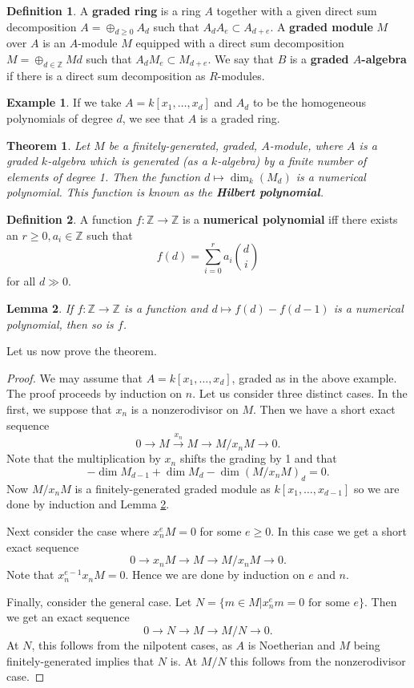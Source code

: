 \documentclass{article}
\newcommand{\Z}{\mathbb{Z}}
\theoremstyle{plain}
\newtheorem{thm}{Theorem}
\newtheorem{lem}[thm]{Lemma}
\theoremstyle{definition}
\newtheorem{defn}{Definition}
\newtheorem{exmp}{Example}
\theoremstyle{remark}
\begin{document}
\begin{defn}
A \textbf{graded ring} is a ring $A$ together with a given direct sum decomposition $A=\oplus_{d\geq 0}A_d$ such that $A_dA_e\subset A_{d+e}$. A \textbf{graded module} $M$
over $A$ is an $A$-module $M$ equipped with a direct sum decomposition $M=\oplus_{d\in\Z}Md$ such that $A_dM_e\subset M_{d+e}$. We say that $B$ is a \textbf{graded $A$-algebra} if there is a direct sum decomposition as $R$-modules.
\end{defn}

\begin{exmp}
If we take $A=k[x_1,\ldots,x_d]$ and $A_d$ to be the homogeneous polynomials of degree $d$, we see that $A$ is a graded ring.
\end{exmp}

\begin{thm}
\label{L65}
Let $M$ be a finitely-generated, graded, $A$-module, where $A$ is a graded $k$-algebra which is generated (as a $k$-algebra) by a finite number of elements of degree 1. Then the function $d\mapsto \dim_k(M_d)$ is a numerical polynomial. This function is known as the \textbf{Hilbert polynomial}.
\end{thm}

\begin{defn}
A function $f:\Z\to\Z$ is a \textbf{numerical polynomial} iff there exists an $r\geq 0,a_i\in \Z$ such that
\[f(d)=\sum_{i=0}^r a_i\binom{d}{i}\]
for all $d\gg 0$.
\end{defn}

\begin{lem}
\label{L66}
If $f:\Z\to\Z$ is a function and $d\mapsto f(d)-f(d-1)$ is a numerical polynomial, then so is $f$.
\end{lem}

Let us now prove the theorem.

\begin{proof}
We may assume that $A=k[x_1,\ldots, x_d]$, graded as in the above example. The proof proceeds by induction on $n$. Let us consider three distinct cases. In the first, we suppose that $x_n$ is a nonzerodivisor on $M$. Then we have a short exact sequence
\[0\to M\overset{x_n}{\to}M\to M/x_nM\to 0.\]
Note that the multiplication by $x_n$ shifts the grading by 1 and that
\[-\dim M_{d-1}+\dim M_d-\dim \left( M/x_nM\right)_d=0.\]
Now $M/x_nM$ is a finitely-generated graded module as $k[x_1,\ldots,x_{d-1}]$ so we are done by induction and Lemma \ref{L66}.

Next consider the case where $x_n^eM=0$ for some $e\geq 0$. In this case we get a short exact sequence
\[0\to x_nM\to M\to M/x_nM\to 0.\]
Note that $x_n^{e-1}x_nM=0$. Hence we are done by induction on $e$ and $n$.

Finally, consider the general case. Let $N=\{m\in M | x_n^e m=0\text{ for some }e\}$. Then
we get an exact sequence
\[0\to N\to M\to M/N\to 0.\]
At $N$, this follows from the nilpotent cases, as $A$ is Noetherian and $M$ being finitely-generated implies that $N$ is. At $M/N$ this follows from the nonzerodivisor case.
\end{proof}
\end{document}
